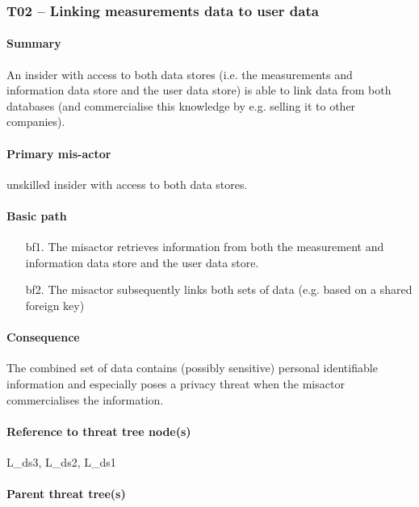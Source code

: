 \subsubsection{T02 -- Linking measurements data to user data}
\label{threats:t02}

\paragraph{Summary}

\npar An insider with access to both data stores (i.e. the measurements and
information data store and the user data store) is able to link data from both
databases (and commercialise this knowledge by e.g. selling it to other
companies).

\paragraph{Primary mis-actor}

\npar unskilled insider with access to both data stores.

\paragraph{Basic path}

\begin{enumerate}
	\item[bf1.] The misactor retrieves information from both the measurement and
	information data store and the user data store.
    \item[bf2.] The misactor subsequently links both sets of data (e.g. based
    on a shared foreign key)
\end{enumerate}

\paragraph{Consequence}

\npar The combined set of data contains (possibly sensitive) personal
identifiable information and especially poses a privacy threat when the misactor
commercialises the information.

\paragraph{Reference to threat tree node(s)}

L\_ds3, L\_ds2, L\_ds1

\paragraph{Parent threat tree(s)}

